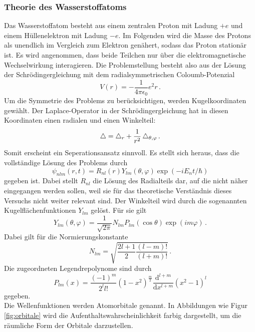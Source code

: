 \subsubsection{Theorie des Wasserstoffatoms}
\label{subsubsec:hatom}
Das Wasserstoffatom besteht aus einem zentralen Proton mit Ladung $+e$ und einem Hüllenelektron mit Ladung $-e$. Im Folgenden wird die Masse des Protons als unendlich im Vergleich zum Elektron genähert, sodass das Proton stationär ist. Es wird angenommen, dass beide Teilchen nur über die elektromagnetische Wechselwirkung interagieren. Die Problemstellung besteht also aus der Lösung der Schrödingergleichung mit dem radialsymmetrischen Coloumb-Potenzial
\begin{equation}
  V(r) = - \frac{1}{4 \pi \epsilon_0}{e^2}{r}\,.
  \label{eqn:coloumb}
\end{equation}
Um die Symmetrie des Problems zu berücksichtigen, werden Kugelkoordinaten gewählt. Der Laplace-Operator in der Schrödingergleichung hat in diesen Koordinaten einen radialen und einen Winkelteil:
\begin{equation}
  \mathop{}\!\mathbin\bigtriangleup = \mathop{}\!\mathbin\bigtriangleup_r + \frac{1}{r^2} \mathop{}\!\mathbin\bigtriangleup_{\theta, \varphi}\,.
  \label{eqn:laplaceWinkel}
\end{equation}
Somit erscheint ein Seperationsansatz sinnvoll. Es stellt sich heraus, dass die vollständige Lösung des Problems durch
\begin{equation}
  \psi_{nlm}(r,t) = R_{nl}(r) Y_{lm}(\theta, \varphi) \exp(-i E_n t / \hbar)
  \label{eqn:hatomloesung}
\end{equation}
gegeben ist. Dabei stellt $R_{nl}$ die Lösung des Radialteils dar, auf die nicht näher eingegangen werden sollen, weil sie für das theoretische Verständnis dieses Versuchs nicht weiter relevant sind. Der Winkelteil wird durch die sogenannten Kugelflächenfunktionen $Y_{lm}$ gelöst. Für sie gilt
\begin{equation}
  Y_{lm}(\theta,\varphi) = \frac{1}{\sqrt{2\pi}} N_{lm} P_{lm}(\cos\theta) \exp(im\varphi)\,.
  \label{eqn:kugelflaechenfunktionen}
\end{equation}
Dabei gilt für die Normierungskonstante
\begin{equation}
  N_{lm} = \sqrt{\frac{2l+1}{2} \frac{(l-m)!}{(l+m)!}}\,.
  \label{eqn:ylmnormierung}
\end{equation}
Die zugeordneten Legendrepolynome sind durch
\begin{equation}
  P_{lm}(x) = \frac{(-1)^m}{2^l l!} (1-x^2)^{\frac{m}{2}} \frac{\mathrm{d}^{l+m}}{\mathrm{d}x^{l+m}} (x^2-1)^l
  \label{eqn:zugeordneteLegendrepolynome}
\end{equation}
gegeben.\\
Die Wellenfunktionen werden Atomorbitale genannt. In Abbildungen wie Figur \ref{fig:orbitale} wird die Aufenthaltswahrscheinlichkeit farbig dargestellt, um die räumliche Form der Orbitale darzustellen.

